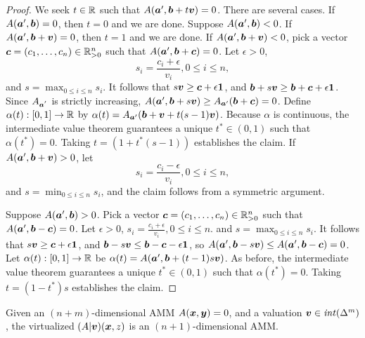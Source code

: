 \begin{proof}
We seek $t \in \mathbb{R}$ such that $A({\boldsymbol a}',{\boldsymbol b} + t {\boldsymbol v}) = 0$.
There are several cases.
If $A({\boldsymbol a}',{\boldsymbol b}) = 0$, then $t=0$ and we are done.
Suppose $A({\boldsymbol a}',{\boldsymbol b}) < 0$.
If $A({\boldsymbol a}',{\boldsymbol b} + {\boldsymbol v}) = 0$, then $t=1$ and we are done.
If $A({\boldsymbol a}',{\boldsymbol b} + {\boldsymbol v}) < 0$,
pick a vector ${\boldsymbol c} = (c_1, \ldots, c_n) \in \mathbb{R}_{>0}^n$
such that $A({\boldsymbol a}',{\boldsymbol b}+{\boldsymbol c}) = 0$.
Let $\epsilon > 0$,
\begin{equation*}
s_i = \frac{c_i + \epsilon}{v_i}, 0 \leq i \leq n,
\end{equation*}
and $s = \max_{0 \leq i \leq n}s_i$.
It follows that $s {\boldsymbol v} \geq {\boldsymbol c} + \epsilon {\boldsymbol 1}$,
and ${\boldsymbol b} + s {\boldsymbol v} \geq {\boldsymbol b} + {\boldsymbol c} + \epsilon {\boldsymbol 1}$.
Since $A_{{\boldsymbol a}^{'}}$ is strictly increasing,
$A({\boldsymbol a}',{\boldsymbol b} + s {\boldsymbol v}) \geq A_{{\boldsymbol a}'}({\boldsymbol b}+{\boldsymbol c}) = 0$.
Define $\alpha(t): [0,1] \to \mathbb{R}$ by $\alpha(t) = A_{{\boldsymbol a}'}({\boldsymbol b} + {\boldsymbol v} + t(s -1){\boldsymbol v})$.
Because $\alpha$ is continuous,
the intermediate value theorem guarantees a unique
$t^{*} \in (0,1)$ such that $\alpha(t^{*}) = 0$.
Taking $t = (1 + t^{*}(s-1))$ establishes the claim.
If $A({\boldsymbol a}',{\boldsymbol b} + {\boldsymbol v}) > 0$,
let
\begin{equation*}
s_i = \frac{c_i - \epsilon}{v_i}, 0 \leq i \leq n,
\end{equation*}
and $s = \min_{0 \leq i \leq n} s_i$,
and the claim follows from a symmetric argument.

Suppose $A({\boldsymbol a}',{\boldsymbol b}) > 0$.
Pick a vector ${\boldsymbol c} = (c_1, \ldots, c_n) \in \mathbb{R}_{>0}^n$
such that $A({\boldsymbol a}',{\boldsymbol b}-{\boldsymbol c}) = 0$.
Let $\epsilon > 0$,
$s_i = \frac{c_i + \epsilon}{v_i}, 0 \leq i \leq n$.
and $s = \max_{0 \leq i \leq n}s_i$.
It follows that $s {\boldsymbol v} \geq {\boldsymbol c} + \epsilon {\boldsymbol 1}$,
and ${\boldsymbol b} - s {\boldsymbol v} \leq {\boldsymbol b} - {\boldsymbol c} - \epsilon {\boldsymbol 1}$,
so $A({\boldsymbol a}',{\boldsymbol b} - s {\boldsymbol v}) \leq A({\boldsymbol a}',{\boldsymbol b}-{\boldsymbol c}) = 0$.
Let $\alpha(t): [0,1] \to \mathbb{R}$ be
$\alpha(t) = A({\boldsymbol a}',{\boldsymbol b} + (t-1)s{\boldsymbol v})$.
As before, the intermediate value theorem guarantees a unique
$t^{*} \in (0,1)$ such that $\alpha(t^{*}) = 0$.
Taking $t = (1-t^{*})s$ establishes the claim.
\end{proof}

\begin{theorem}
Given an $(n+m)$-dimensional AMM $A({\boldsymbol x},{\boldsymbol y}) = 0$,
and a valuation ${\boldsymbol v} \in \mathit{int}(\Delta^m)$,
the virtualized $(A|{\boldsymbol v})({\boldsymbol x},z)$ is an $(n+1)$-dimensional AMM.
\end{theorem}

